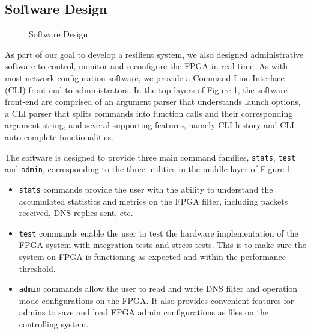\documentclass[a4paper]{report}
\newcommand{\code}{\texttt}
\begin{document}
\subsection{Software Design}

\begin{figure}[h!]
  \caption{Software Design}
  \label{fig:software-design}
\end{figure}

As part of our goal to develop a resilient system, we also designed administrative software to control, monitor and reconfigure the FPGA in real-time. As with most network configuration software, we provide a Command Line Interface (CLI) front end to administrators. In the top layers of Figure \ref{fig:software-design}, the software front-end are comprised of an argument parser that understands launch options, a CLI parser that splits commands into function calls and their corresponding argument string, and several supporting features, namely CLI history and CLI auto-complete functionalities.

The software is designed to provide three main command families, \code{stats}, \code{test} and \code{admin}, corresponding to the three utilities in the middle layer of Figure \ref{fig:software-design}. 
\begin{itemize}
    \item \code{stats} commands provide the user with the ability to understand the accumulated statistics and metrics on the FPGA filter, including packets received, DNS replies sent, etc.
    \item \code{test} commands enable the user to test the hardware implementation of the FPGA system with integration tests and stress tests. This is to make sure the system on FPGA is functioning as expected and within the performance threshold.
    \item \code{admin} commands allow the user to read and write DNS filter and operation mode configurations on the FPGA. It also provides convenient features for admins to save and load FPGA admin configurations as files on the controlling system.
\end{itemize}
\end{document}
